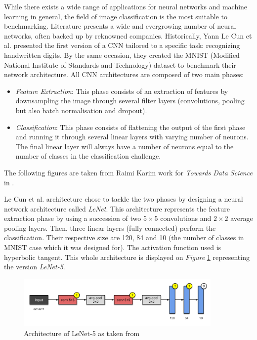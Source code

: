 While there exists a wide range of applications for neural networks and machine learning in general, the field of image classification is the most suitable to benchmarking. Literature presents a wide and evergrowing number of neural networks, often backed up by reknowned companies. Historically, Yann Le Cun et al. \cite{LeCun1998} presented the first version of a CNN tailored to a specific task: recognizing handwritten digits. By the same occasion, they created the MNIST (Modified National Institute of Standards and Technology) dataset to benchmark their network architecture. All CNN architectures are composed of two main phases:
\begin{itemize}
  \item \emph{Feature Extraction}: This phase consists of an extraction of features by downsampling the image through several filter layers (convolutions, pooling but also batch normalisation and dropout).
  \item \emph{Classification}: This phase consists of flattening the output of the first phase and running it through several linear layers with varying number of neurons. The final linear layer will always have a number of neurons equal to the number of classes in the classification challenge.
\end{itemize}

The following figures are taken from Raimi Karim work for \emph{Towards Data Science} in \cite{Karim2020}.

Le Cun et al. \cite{LeCun1998} architecture chose to tackle the two phases by designing a neural network architecture called \emph{LeNet}. This architecture represents the feature extraction phase by using a succession of two $5 \times 5$ convolutions and $2 \times 2$ average pooling layers. Then, three linear layers (fully connected) perform the classification. Their respective size are 120, 84 and 10 (the number of classes in MNIST \cite{LeCun2010} case which it was designed for). The activation function used is hyperbolic tangent. This whole architecture is displayed on \emph{Figure} \ref{fig:LeNet-5} representing the version \emph{LeNet-5}.

\begin{figure}[htbp]
	\centering
		\includegraphics[width=10cm]{Figures/LeNet-5.png}
	\caption[LeNet-5]{Architecture of LeNet-5 as taken from \cite{LeCun1998}}
	\label{fig:LeNet-5}
\end{figure}

